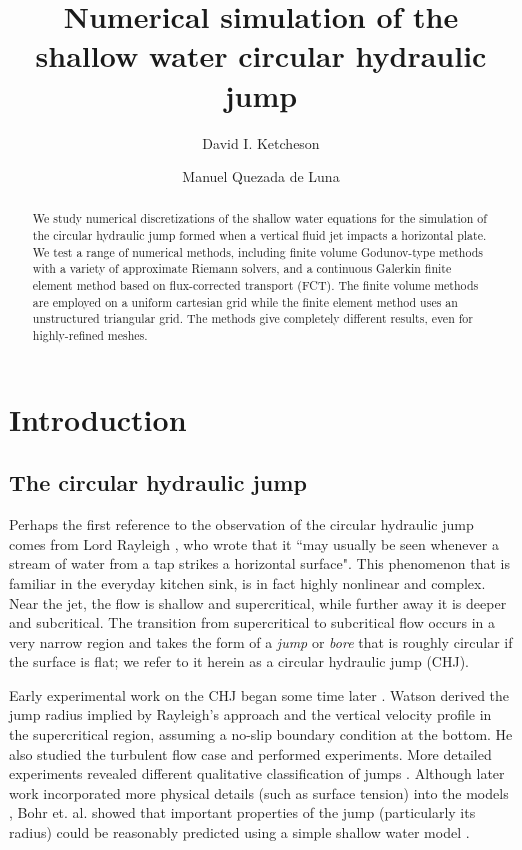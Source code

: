 \documentclass{article}
\title{Numerical simulation of the shallow water circular hydraulic jump}
\author{
    David I. Ketcheson \and
    Manuel Quezada de Luna
}
\begin{document}
\maketitle

\begin{abstract}
We study numerical discretizations of the shallow water equations
for the simulation of the circular hydraulic jump formed
when a vertical fluid jet impacts a horizontal plate.  
We test a range of numerical methods, including finite volume Godunov-type
methods with a variety of approximate Riemann solvers, and
a continuous Galerkin finite element method based on flux-corrected transport (FCT).
The finite volume methods are employed on a uniform cartesian grid
while the finite element method uses an unstructured triangular grid.
The methods give completely different results, even for highly-refined meshes.
\end{abstract}


\section{Introduction}

\subsection{The circular hydraulic jump}

Perhaps the first reference to the observation of the circular hydraulic jump
comes from Lord Rayleigh \cite{rayleigh1914theory}, who wrote that it
``may usually be seen whenever a stream of water from a tap strikes a horizontal
surface".  This phenomenon that is familiar in the everyday kitchen sink, is in
fact highly nonlinear and complex.  Near the jet, the flow is shallow and
supercritical, while further away it is deeper and subcritical.  The transition from supercritical
to subcritical flow
occurs in a very narrow region and takes the form of a \emph{jump} or \emph{bore}
that is roughly circular if the surface is flat; we refer to it herein as a
circular hydraulic jump (CHJ).

Early experimental work on the CHJ began some time later
\cite{kurihara1946hydraulic,tani1949water,watson1964radial}.
Watson \cite{watson1964radial} derived the jump radius
implied by Rayleigh's approach and the vertical
velocity profile in the supercritical region, assuming a no-slip
boundary condition at the bottom.  He also studied the turbulent
flow case and performed experiments.
More detailed experiments revealed different qualitative classification
of jumps  \cite{ishigai1977heat,craik1981circular}.
Although later work incorporated more physical details (such as surface tension) into the models
\cite{bush2003influence}, Bohr et. al. showed that important properties of the jump
(particularly its radius) could be reasonably predicted using a simple shallow water
model \cite{bohr1993shallow}.
\end{document}
